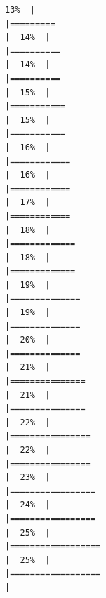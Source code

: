 \documentclass[
  english,
  man,a4paper,mask,floatsintext]{apa6}
\begin{document}
\begin{verbatim}
13%  |                                                                              |=========                                                             |  14%  |                                                                              |==========                                                            |  14%  |                                                                              |==========                                                            |  15%  |                                                                              |===========                                                           |  15%  |                                                                              |===========                                                           |  16%  |                                                                              |============                                                          |  16%  |                                                                              |============                                                          |  17%  |                                                                              |============                                                          |  18%  |                                                                              |=============                                                         |  18%  |                                                                              |=============                                                         |  19%  |                                                                              |==============                                                        |  19%  |                                                                              |==============                                                        |  20%  |                                                                              |==============                                                        |  21%  |                                                                              |===============                                                       |  21%  |                                                                              |===============                                                       |  22%  |                                                                              |================                                                      |  22%  |                                                                              |================                                                      |  23%  |                                                                              |=================                                                     |  24%  |                                                                              |=================                                                     |  25%  |                                                                              |==================                                                    |  25%  |                                                                              |==================                                                    |  
\end{verbatim}
\end{document}
